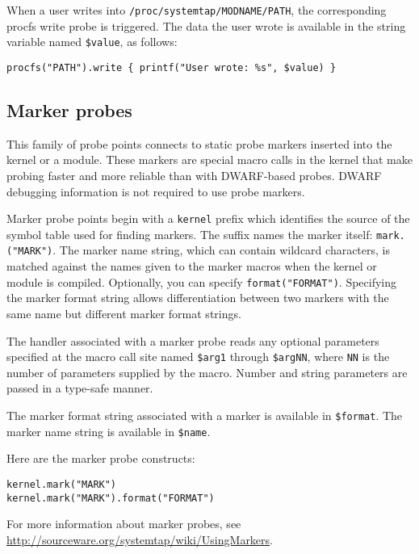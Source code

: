 \documentclass[twoside,english]{article}
\newenvironment{vindent}
{\begin{list}{}{\setlength{\listparindent}{6pt}}
\item[]}
{\end{list}}
\begin{document}
When a user writes into \texttt{/proc/systemtap/MODNAME/PATH}, the
corresponding procfs write probe is triggered.  The data the user
wrote is available in the string variable named \texttt{\$value}, as
follows:
\begin{vindent}
\begin{verbatim}
procfs("PATH").write { printf("User wrote: %s", $value) }
\end{verbatim}
\end{vindent}


\subsection{Marker probes}
This family of probe points connects to static probe markers inserted
into the kernel or a module. These markers are special macro calls in
the kernel that make probing faster and more reliable than with
DWARF-based probes.  DWARF debugging information is not required to
use probe markers.

Marker probe points begin with a \texttt{kernel} prefix which
identifies the source of the symbol table used for finding
markers. The suffix names the marker itself:
\texttt{mark.("MARK")}. The marker name string, which can contain
wildcard characters, is matched against the names given to the marker
macros when the kernel or module is compiled.  Optionally, you can
specify \texttt{format("FORMAT")}.  Specifying the marker format
string allows differentiation between two markers with the same name
but different marker format strings.

The handler associated with a marker probe reads any optional
parameters specified at the macro call site named \texttt{\$arg1}
through \texttt{\$argNN}, where \texttt{NN} is the number of
parameters supplied by the macro. Number and string parameters are
passed in a type-safe manner.

The marker format string associated with a marker is available in
\texttt{\$format}. The marker name string is available in
\texttt{\$name}.

Here are the marker probe constructs:
\begin{vindent}
\begin{verbatim}
kernel.mark("MARK")
kernel.mark("MARK").format("FORMAT")
\end{verbatim}
\end{vindent}

For more information about marker probes, see
\url{http://sourceware.org/systemtap/wiki/UsingMarkers}.
\end{document}
